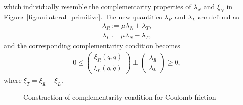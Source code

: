 which individually resemble the complementarity properties of $\lambda_N$ and
$\xi_N$ in Figure~\ref{fig:unilateral_primitive}.
%
The new quantities $\lambda_R$ and $\lambda_L$ are defined as~\cite{glocker2005formulation}
\begin{align*}
  \lambda_R := \mu \lambda_N + \lambda_T, \\
  \lambda_L := \mu \lambda_N - \lambda_T, 
\end{align*}
\noindent and the corresponding complementarity condition becomes
%
\begin{equation}
  \begin{gathered}
    0 \leq 
    \begin{pmatrix}
      \xi_R(q, \dot{q}) \\
      \xi_L(q, \dot{q})
    \end{pmatrix} 
    \perp
      \begin{pmatrix}
        \lambda_R  \\
        \lambda_L
      \end{pmatrix} \geq 0,
    \end{gathered}
    \label{eq:tangential_complementarity}
\end{equation}
where $\xi_T = \xi_R - \xi_L$.
%
\begin{figure}[tb]
  \centering
  \caption{Construction of complementarity condition for Coulomb friction}
  \label{fig:tangential_to_complementarity}
\end{figure}

